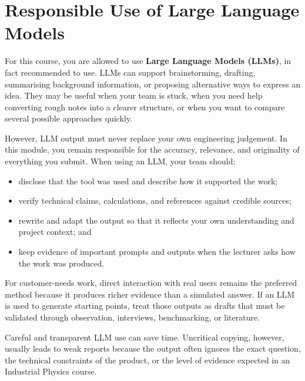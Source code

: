 \section{Responsible Use of Large Language Models}

For this course, you are allowed to use \textbf{Large Language Models (LLMs)}, in fact recommended to use. LLMs can support brainstorming, drafting, summarising background information, or proposing alternative ways to express an idea. They may be useful when your team is stuck, when you need help converting rough notes into a clearer structure, or when you want to compare several possible approaches quickly.

However, LLM output must never replace your own engineering judgement. In this module, you remain responsible for the accuracy, relevance, and originality of everything you submit. When using an LLM, your team should:
\begin{itemize}
    \item disclose that the tool was used and describe how it supported the work;
    \item verify technical claims, calculations, and references against credible sources;
    \item rewrite and adapt the output so that it reflects your own understanding and project context; and
    \item keep evidence of important prompts and outputs when the lecturer asks how the work was produced.
\end{itemize}

For customer-needs work, direct interaction with real users remains the preferred method because it produces richer evidence than a simulated answer. If an LLM is used to generate starting points, treat those outputs as drafts that must be validated through observation, interviews, benchmarking, or literature.

Careful and transparent LLM use can save time. Uncritical copying, however, usually leads to weak reports because the output often ignores the exact question, the technical constraints of the product, or the level of evidence expected in an Industrial Physics course.
